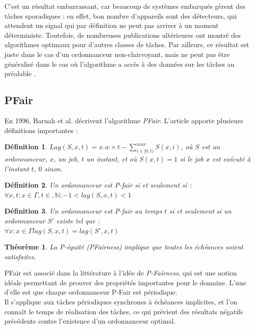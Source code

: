 \documentclass[11pt,a4paper,oneside]{report}
\newtheorem{mydef}{Définition}
\newtheorem{mytheorem}{Théorème}
\begin{document}
C'est un résultat embarrassant, car beaucoup de systèmes embarqués gèrent des tâches sporadiques :
en effet, bon nombre d'appareils sont des détecteurs, qui attendent un signal qui par définition 
ne peut pas arriver à un moment déterministe. 
Toutefois, de nombreuses publications ultérieures ont montré des algorithmes 
optimaux pour d'autres classes de tâches. Par ailleurs, ce résultat est juste dans le cas 
d'un ordonnanceur non-clairvoyant, mais ne peut pas être généralisé dans le cas où 
l'algorithme a accès à des données sur les tâches au préalable \cite{fisher_optimal_2010}.

\subsection{PFair}
En 1996, Baruah et al. décrivent l'algorithme \textit{PFair}.
L'article apporte plusieurs définitions importantes :
\begin{mydef} %
	$Lag(S, x, t) = x.w \times t - \sum_{i\in[0,t)}^{max} S(x, i)$, où 
	$S$ est un ordonnanceur, $x$, un job, $t$ un instant, et où $S(x, t) = 1$ si 
	le job $x$ est exécuté à l'instant $t$, $0$ sinon.
\end{mydef}
\begin{mydef}
	Un ordonnanceur est P-fair si et seulement si :\\
	$\forall x, t : x \in \Gamma, t\in , \mathbb{N} : -1 < lag(S,x,t) < 1$
\end{mydef}
\begin{mydef}
	Un ordonnanceur est P-fair au temps $t$ si et seulement si un ordonnanceur $S'$ existe tel que : \\
	$\forall x: x \in \Gamma  lag(S,x,t) = lag(S',x,t)$
\end{mydef}
\begin{mytheorem}
	La P-équité (PFairness) implique que toutes les échéances soient satisfaites.
\end{mytheorem}

PFair est associé dans la littérature à l'idée de \textit{P-Fairness}, qui est une notion 
idéale permettant de prouver des propriétés importantes pour le domaine. 
L'une d'elle est que chaque ordonnanceur P-Fair est périodique. \\

Il s'applique aux tâches périodiques synchrones à échéances implicites, 
et l'on connaît le temps de réalisation des tâches, 
ce qui prévient des résultats négatifs précédents contre 
l'existence d'un ordonnanceur optimal.\\
\end{document}
